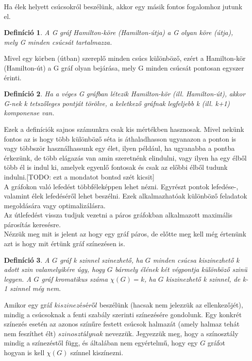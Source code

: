 \documentclass[12pt]{article}
\newtheorem{defin}{Definíció}[section]
\begin{document}
Ha élek helyett csúcsokról beszélünk, akkor egy másik fontos fogalomhoz jutunk el.

\begin{defin}
A G gráf Hamilton-köre (Hamilton-útja) a G olyan köre (útja), mely G minden csúcsát tartalmazza. ~\cite{szam:Fleiner}
\end{defin}

Mivel egy körben (útban) szereplő minden csúcs különböző, ezért a Hamilton-kör (Hamilton-út) a G gráf olyan bejárása, mely G minden csúcsát pontosan egyszer érinti.

\begin{defin}
Ha a véges G gráfban létezik Hamilton-kör (ill. Hamilton-út), akkor G-nek k tetszőleges pontját törölve, a keletkező gráfnak legfeljebb k (ill. k+1) komponense van. ~\cite{szam:Fleiner}
\end{defin}

Ezek a definíciók sajnos számunkra csak kis mértékben hasznosak. Mivel nekünk fontos az is hogy több különböző séta is áthaladhasson ugyanazon a ponton is vagy többször használhassunk egy élet, ilyen például, ha ugyanabba a pontba érkezünk, de több elágazás van amin szeretnénk elindulni, vagy ilyen ha egy élből több él is indul ki, amelyek egyenlő fontosak és csak az előbbi élből tudunk indulni.[TODO: ezt a mondatot bontsd szét kicsit]\\ 

A gráfokon való lefedést többféleképpen lehet nézni. Egyrészt pontok lefedése-, valamint élek lefedéséről lehet beszélni. Ezek alkalmazhatóak különböző feladatok megoldására vagy optimalizálásra.\\
Az útlefedést vissza tudjuk vezetni a páros gráfokban alkalmazott maximális párosítás keresésre.\\

Nézzük meg mit is jelent az hogy egy gráf páros, de előtte meg kell még értenünk azt is hogy mit értünk gráf színezésen is.

\begin{defin}
A $G$ gráf k szinnel szinezhető, ha $G$ minden csúcsa kiszinezhető k adott szin valamelyikére úgy, hogy $G$ bármely élének két végpontja különböző szinü legyen. A $G$ gráf kromatikus száma $\chi(G) = k$, ha $G$ kiszinezhető k szinnel, de k-1 szinnel még nem. ~\cite{szam:Fleiner}
\end{defin}

Amikor egy gráf $kiszinezéséről$ beszélünk (hacsak nem jelezzük az ellenkezőjét), mindig a csúcsoknak a fenti szabály szerinti színezésére gondolunk. Egy konkrét színezés esetén az azonos színűre festett csúcsok halmazát (amely halmaz tehát nem feszíthet élt) $szinosztálynak$ nevezzük. Jegyezzük meg, hogy a színosztály mindig a színezéstől függ, és általában nem egyértelmű, hogy egy $G$ gráfot hogyan is kell $\chi(G)$ színnel kiszínezni.
\end{document}
